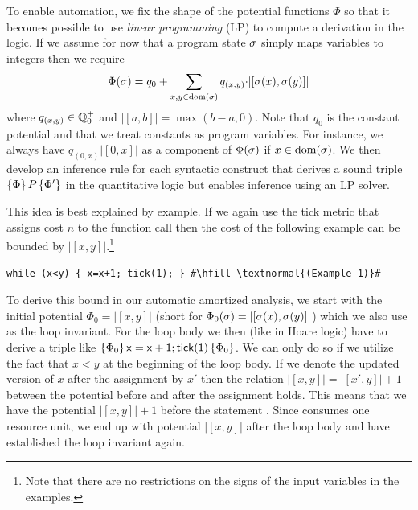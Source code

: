 \documentclass[nocopyrightspace,preprint]{sigplanconf}
\newcommand{\iffull}[2]{\ifx\fullversion\undefined{#2}\else{#1}\fi}
\begin{document}
To enable automation, we fix the shape of the potential functions
$\Phi$ so that it becomes possible to use \emph{linear programming}
(LP) to compute a derivation in the logic.  If we assume for now that
a program state $\sigma$ simply maps variables to integers then we
require
$$
\Phi(\sigma) = q_0 + \sum_{x,y \in  \text{dom}(\sigma)} q_{(x,y)} {\cdot} |[\sigma(x),\sigma(y)]|
$$
where $q_{(x,y)} \in \mathbb Q^+_0$ and $|[a,b]| = \max(b-a,0)$.  Note that
$q_0$ is the constant potential and that we treat constants as program
variables.  For instance, we always have $q_{(0,x)}|[0,x]|$ as a
component of $\Phi(\sigma)$ if $x \in  \text{dom}(\sigma)$.
%
We then develop an inference rule for each syntactic construct that
derives a sound triple $\{\Phi\}\, P\, \{\Phi'\}$ in the quantitative
logic but enables inference using an LP solver.

This idea is best explained by example.  If we again use the
tick metric that assigns cost $n$ to the function call
\iffull{ and cost $0$ to all other operations}{} then
the cost of the following example can be bounded by $|[x,y]|$.\footnote{Note
that there are no restrictions on the signs of the input variables in
the examples.}
\begin{lstlisting}[basicstyle=\tt\small]
while (x<y) { x=x+1; tick(1); } #\hfill \textnormal{(Example 1)}#
\end{lstlisting}
To derive this bound in our automatic amortized analysis, we start
with the initial potential $\Phi_0 = |[x,y]|$ (short for
$\Phi_0(\sigma) = |[\sigma(x),\sigma(y)]|$) which we also use as the
loop invariant.  For the loop body we then (like in Hoare logic) have
to derive a triple like
$\{\Phi_0\}\, \mathsf{x=x+1;tick(1)}\, \{\Phi_0\}$.  We can
only do so if we utilize the fact that $x<y$ at the beginning of the
loop body.  %
If we denote the updated version of $x$ after the
assignment by $x'$ then the relation $|[x,y]| = |[x',y]| + 1$ between
the potential before and after the assignment  holds.
This means that we have the potential $|[x,y]| + 1$ before the
statement .  Since  consumes one resource unit,
we end up with potential $|[x,y]|$ after the loop body and have
established the loop invariant again.
\end{document}
